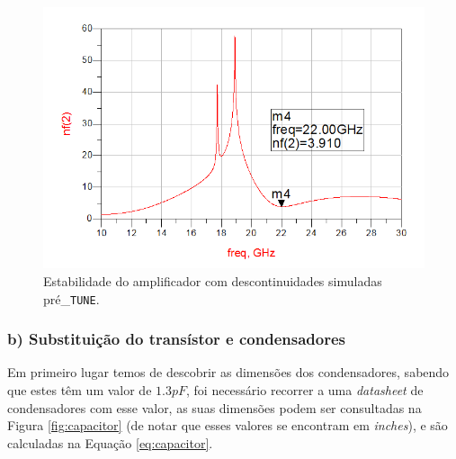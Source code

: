 \documentclass[11pt]{article}
\numberwithin{equation}{section}
\begin{document}
\begin{figure}[H]
	\centering
	\includegraphics[keepaspectratio=true, scale=0.45]{exps/descont_noise_pos_tune}
	\vspace{-0.5em}
	\caption{Estabilidade do amplificador com descontinuidades simuladas pré\_\texttt{TUNE}.}
	\vspace{-0.8em}
	\label{fig:descont_noise_pos_tune}
\end{figure}



\subsubsection{b) Substituição do transístor e condensadores}

Em primeiro lugar temos de descobrir as dimensões dos condensadores, sabendo que estes têm um valor de $ 1.3 pF $, foi necessário recorrer a uma \textit{datasheet} de condensadores com esse valor, as suas dimensões podem ser consultadas na Figura \ref{fig:capacitor} (de notar que esses valores se encontram em \textit{inches}), e são calculadas na Equação \ref{eq:capacitor}.
\end{document}
